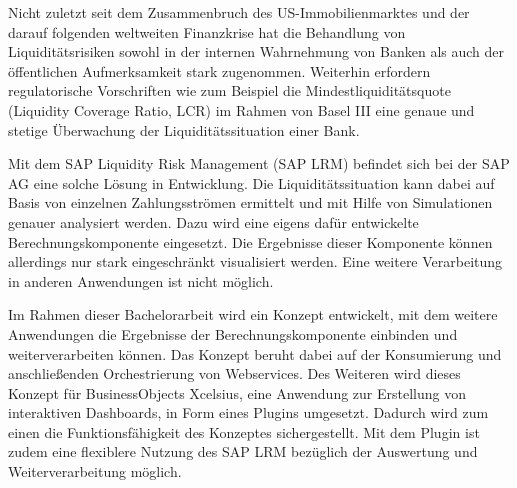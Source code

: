 \seKurzfassung{}
\begin{onehalfspacing}
Nicht zuletzt seit dem Zusammenbruch des US-Immobilienmarktes und der darauf folgenden weltweiten Finanzkrise hat die Behandlung von Liquiditätsrisiken sowohl in der internen Wahrnehmung von Banken als auch der öffentlichen Aufmerksamkeit stark zugenommen. Weiterhin erfordern regulatorische Vorschriften wie zum Beispiel die Mindestliquiditätsquote (Liquidity Coverage Ratio, LCR) im Rahmen von Basel III eine genaue und stetige Überwachung der Liquiditätssituation einer Bank.

Mit dem SAP Liquidity Risk Management (SAP LRM) befindet sich bei der SAP AG eine solche Lösung in Entwicklung. Die Liquiditätssituation kann dabei auf Basis von einzelnen Zahlungsströmen ermittelt und mit Hilfe von Simulationen genauer analysiert werden. Dazu wird eine eigens dafür entwickelte Berechnungskomponente eingesetzt. Die Ergebnisse dieser Komponente können allerdings nur stark eingeschränkt visualisiert werden. Eine weitere Verarbeitung in anderen Anwendungen ist nicht möglich.

Im Rahmen dieser Bachelorarbeit wird ein Konzept entwickelt, mit dem weitere Anwendungen die Ergebnisse der Berechnungskomponente einbinden und weiterverarbeiten können. Das Konzept beruht dabei auf der Konsumierung und anschließenden Orchestrierung von Webservices. Des Weiteren wird dieses Konzept für BusinessObjects Xcelsius, eine Anwendung zur Erstellung von interaktiven Dashboards, in Form eines Plugins umgesetzt. Dadurch wird zum einen die Funktionsfähigkeit des Konzeptes sichergestellt. Mit dem Plugin ist zudem eine flexiblere Nutzung des SAP LRM bezüglich der Auswertung und Weiterverarbeitung möglich.
\end{onehalfspacing}

\newpage

\glsresetall

\seInhaltsverzeichnis[
einrueckung=ja,
gliederungsebenen=4
]



